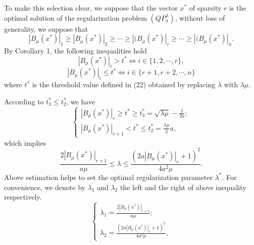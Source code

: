 \documentclass[smallextended]{svjour3}
\begin{document}
To make this selection clear, we suppose that the vector $x^{\ast}$ of sparsity $r$ is the optimal solution of the regularization problem $(QP_{a}^{\lambda})$,
without loss of generality, we suppose that
$$|B_{\mu}(x^{\ast})|_{1}\geq|B_{\mu}(x^{\ast})|_{2}\geq\cdots\geq|(B_{\mu}(x^{\ast})|_{r}\geq\cdots\geq|(B_{\mu}(x^{\ast})|_{n}.$$
By Corollary 1, the following inequalities hold
$$|B_{\mu}(x^{\ast})|_{i}>t^{\ast}\Leftrightarrow i\in\{1,2,\cdots,r\},$$
$$|B_{\mu}(x^{\ast})|_{i}\leq t^{\ast}\Leftrightarrow i\in\{r+1,r+2,\cdots,n\}$$
where $t^{\ast}$ is the threshold value defined in (22) obtained by replacing $\lambda$ with $\lambda\mu$.

According to $t_{3}^{\ast}\leq t_{2}^{\ast}$, we have
\begin{equation}\label{r30}
\left\{
  \begin{array}{ll}
   |B_{\mu}(x^{\ast})|_{r}\geq t^{\ast}\geq t_{3}^{\ast}=\sqrt{\lambda\mu}-\frac{1}{2a}; \\
   |B_{\mu}(x^{\ast})|_{r+1}<t^{\ast}\leq t_{2}^{\ast}=\frac{\lambda\mu}{2}a,
  \end{array}
\right.
\end{equation}
which implies
\begin{equation}\label{r31}
\frac{2|B_{\mu}(x^{\ast})|_{r+1}}{a\mu}\leq\lambda\leq\frac{(2a|B_{\mu}(x^{\ast})|_{r}+1)^{2}}{4a^{2}\mu}.
\end{equation}
Above estimation helps to set the optimal regularization parameter $\lambda^{\ast}$. For convenience, we denote by
$\lambda_{1}$ and $\lambda_{2}$ the left and the right of above inequality respectively.
$$
\left\{
  \begin{array}{ll}
   \lambda_{1}=\frac{2|B_{\mu}(x^{\ast})|_{r+1}}{a\mu}; \\
   \lambda_{2}=\frac{(2a|B_{\mu}(x^{\ast})|_{r}+1)^{2}}{4a^{2}\mu},
  \end{array}
\right.
$$
\end{document}
